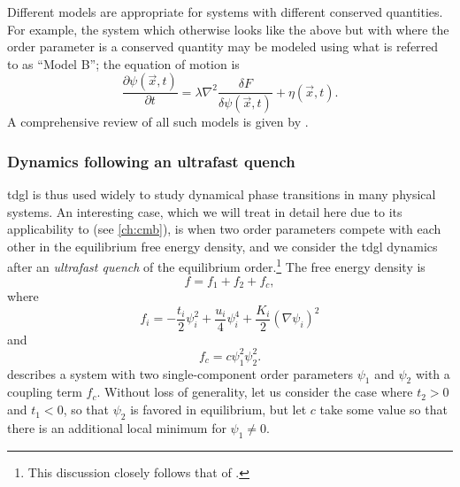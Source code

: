 Different models are appropriate for systems with different conserved quantities.
For example, the system which otherwise looks like the above but with where the order parameter is a conserved quantity may be modeled using what is referred to as ``Model B''\citep{kawasaki_diffusion_1966}; the equation of motion is
\begin{equation}\label{eq:modelbequation}
\frac{\partial\psi(\vec{x}, t)}{\partial t} = \lambda \nabla^2\frac{\delta F}{\delta \psi(\vec{x}, t)}+\eta(\vec{x}, t).
\end{equation}
A comprehensive review of all such models is given by \citet{hohenberg_theory_1977}.

\subsubsection{Dynamics following an ultrafast quench}\label{sec:sunandmillis}

\Gls{tdgl} is thus used widely to study dynamical phase transitions in many physical systems.
An interesting case, which we will treat in detail here due to its applicability to  (see \cref{ch:cmb}), is when two order parameters compete with each other in the equilibrium free energy density, and we consider the \gls{tdgl} dynamics after an \emph{ultrafast quench} of the equilibrium order.\footnote{This discussion closely follows that of \citet{sun_transient_2020}.}
The free energy density is
\begin{equation}\label{eq:coupledfreeenergydensity}
f = f_1+f_2+f_c,
\end{equation}
where
\begin{equation}
f_i = -\frac{t_i}{2} \psi_i^2+\frac{u_i}{4}\psi_i^4+\frac{K_i}{2}(\nabla\psi_i)^2
\end{equation}
and
\begin{equation}
f_c = c\psi_1^2\psi_2^2.
\end{equation}
 describes a system with two single-component order parameters $\psi_1$ and $\psi_2$ with a coupling term $f_c$.
Without loss of generality, let us consider the case where $t_2>0$ and $t_1<0$, so that $\psi_2$ is favored in equilibrium, but let $c$ take some value so that there is an additional local minimum for $\psi_1\neq0$.

